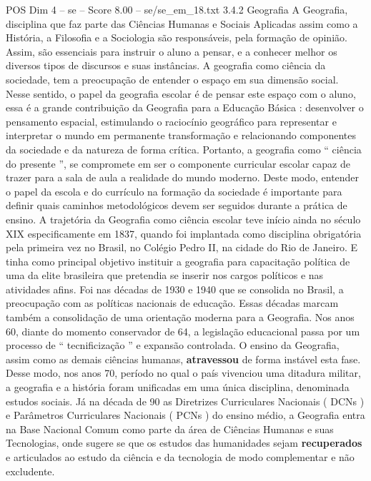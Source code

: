 \begin{textsample}{POS Dim 4 – se – Score 8.00 – se/se\_em\_18.txt}  \label{ex:f4_pos_146}
3.4.2 Geografia A Geografia, disciplina que faz parte das Ciências Humanas e Sociais Aplicadas assim como a História, a Filosofia e a Sociologia são responsáveis, pela formação de opinião.
Assim, são essenciais para instruir o aluno a pensar, e a conhecer melhor os diversos tipos de discursos e suas instâncias.
A geografia como ciência da sociedade, tem a preocupação de entender o espaço em sua dimensão social.
Nesse sentido, o papel da geografia escolar é de pensar este espaço com o aluno, essa é a grande contribuição da Geografia para a Educação Básica : desenvolver o pensamento espacial, estimulando o raciocínio geográfico para representar e interpretar o mundo em permanente transformação e relacionando componentes da sociedade e da natureza de forma crítica.
Portanto, a geografia como “ ciência do presente ”, se compromete em ser o componente curricular escolar capaz de trazer para a sala de aula a realidade do mundo moderno.
Deste modo, entender o papel da escola e do currículo na formação da sociedade é importante para definir quais caminhos metodológicos devem ser seguidos durante a prática de ensino.
A trajetória da Geografia como ciência escolar teve início ainda no século XIX especificamente em 1837, quando foi implantada como disciplina obrigatória pela primeira vez no Brasil, no Colégio Pedro II, na cidade do Rio de Janeiro.
E tinha como principal objetivo instituir a geografia para capacitação política de uma da elite brasileira que pretendia se inserir nos cargos políticos e nas atividades afins.
Foi nas décadas de 1930 e 1940 que se consolida no Brasil, a preocupação com as políticas nacionais de educação.
Essas décadas marcam também a consolidação de uma orientação moderna para a Geografia.
Nos anos 60, diante do momento conservador de 64, a legislação educacional passa por um processo de “ tecnificização ” e expansão controlada.
O ensino da Geografia, assim como as demais ciências humanas, \textbf{atravessou} de forma instável esta fase.
Desse modo, nos anos 70, período no qual o país vivenciou uma ditadura militar, a geografia e a história foram unificadas em uma única disciplina, denominada estudos sociais.
Já na década de 90 as Diretrizes Curriculares Nacionais ( DCNs ) e Parâmetros Curriculares Nacionais ( PCNs ) do ensino médio, a Geografia entra na Base Nacional Comum como parte da área de Ciências Humanas e suas Tecnologias, onde sugere se que os estudos das humanidades sejam \textbf{recuperados} e articulados ao estudo da ciência e da tecnologia de modo complementar e não excludente.

\end{textsample}
